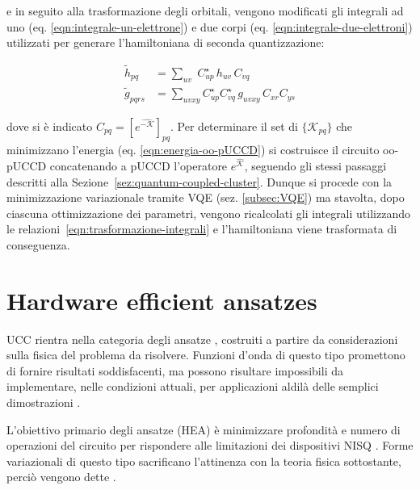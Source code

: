 e in seguito alla trasformazione degli orbitali, vengono modificati gli integrali ad uno (eq. \ref{eqn:integrale-un-elettrone}) e due corpi (eq. \ref{eqn:integrale-due-elettroni}) utilizzati per generare l'hamiltoniana di seconda quantizzazione:

\begin{subequations}\label{eqn:trasformazione-integrali}
\begin{align}
    \tilde{h}_{pq}   &= \sum_{uv}\; C_{up}^{\star}\, h_{uv} \,C_{vq}\\
    \tilde{g}_{pqrs} &= \sum_{uvxy} C_{up}^{\star}C_{vq}^{\star}\, g_{uvxy} \,C_{xr}C_{ys}
\end{align}
\end{subequations}

dove si è indicato $C_{pq} = [ e^{\hat{-\mathcal{K}}} ]_{pq}$. Per determinare il set di $\{\mathcal{K}_{pq}\}$ che minimizzano l'energia (eq. \ref{eqn:energia-oo-pUCCD}) si costruisce il circuito oo-pUCCD concatenando a pUCCD l'operatore $e^{\hat{\mathcal{K}}}$, seguendo gli stessi passaggi descritti alla Sezione~\ref{sez:quantum-coupled-cluster}. 
Dunque si procede con la minimizzazione variazionale tramite VQE (sez. \ref{subsec:VQE}) ma stavolta, dopo ciascuna ottimizzazione dei parametri, vengono ricalcolati gli integrali utilizzando le relazioni~\ref{eqn:trasformazione-integrali} e l'hamiltoniana viene trasformata di conseguenza. 

\section{Hardware efficient ansatzes}\label{sez:hardware-efficient}

UCC rientra nella categoria degli ansatze , costruiti a partire da considerazioni sulla fisica del problema da risolvere. Funzioni d'onda di questo tipo promettono di fornire risultati soddisfacenti, ma possono risultare impossibili da implementare, nelle condizioni attuali, per applicazioni aldilà delle semplici dimostrazioni \cite{Bharti_2022}. 

L'obiettivo primario degli ansatze  (HEA) è minimizzare profondità e numero di operazioni del circuito per rispondere alle limitazioni dei dispositivi NISQ \cite{Leone_2024}. Forme variazionali di questo tipo sacrificano l'attinenza con la teoria fisica sottostante, perciò vengono dette .

